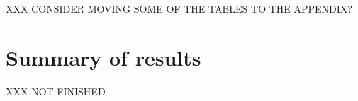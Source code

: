  

XXX CONSIDER MOVING SOME OF THE TABLES TO THE APPENDIX?

\section{Summary of results}
XXX NOT FINISHED



